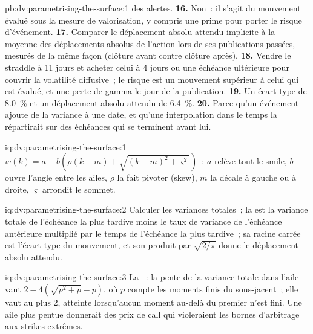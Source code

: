 \begin{solution}{pb:dv:parametrising-the-surface:1}
des alertes.
\textbf{16.} Non~: il s'agit du mouvement évalué sous la mesure de valorisation, y compris une prime pour porter le
risque d'événement.
\textbf{17.} Comparer le déplacement absolu attendu implicite à la moyenne des déplacements absolus de l'action lors de ses
publications passées, mesurés de la même façon (clôture avant contre clôture après).
\textbf{18.} Vendre le straddle à 11 jours et acheter celui à 4 jours ou une échéance ultérieure pour couvrir la volatilité
diffusive~; le risque est un mouvement supérieur à celui qui est évalué, et une perte de gamma le jour de la publication.
\textbf{19.} Un écart-type de 8.0~\% et un déplacement absolu attendu de 6.4~\%.
\textbf{20.} Parce qu'un événement ajoute de la variance à une date, et qu'une interpolation dans le temps la répartirait sur
des échéances qui se terminent avant lui.
\end{solution}

\begin{solution}{iq:dv:parametrising-the-surface:1}
$w(k)=a+b(\rho(k-m)+\sqrt{(k-m)^2+\varsigma^2})$~: $a$ relève tout le smile, $b$ ouvre l'angle entre
les ailes, $\rho$ la fait pivoter (skew), $m$ la décale à gauche ou à droite, $\varsigma$ arrondit le sommet.
\end{solution}

\begin{solution}{iq:dv:parametrising-the-surface:2}
Calculer les variances totales~; la  est la variance totale de l'échéance la plus tardive moins
le taux de variance de l'échéance antérieure multiplié par le temps de l'échéance la plus tardive~; sa racine carrée est l'écart-type du
mouvement, et son produit par $\sqrt{2/\pi}$ donne le déplacement absolu attendu.
\end{solution}

\begin{solution}{iq:dv:parametrising-the-surface:3}
La ~: la pente de la variance totale dans l'aile vaut $2-4(\sqrt{p^2+p}-p)$, où $p$ compte
les moments finis du sous-jacent~; elle vaut au plus 2, atteinte lorsqu'aucun moment au-delà du premier n'est
fini. Une aile plus pentue donnerait des prix de call qui violeraient les bornes d'arbitrage aux strikes extrêmes.
\end{solution}

